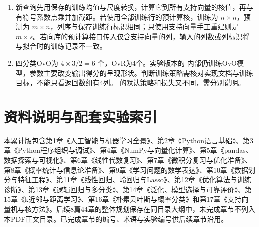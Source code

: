 \documentclass[UTF8,fontset=none,zihao=-4,a4paper]{ctexart}
\newcommand{\code}[1]{\texttt{\detokenize{#1}}}
\numberwithin{equation}{section}
\numberwithin{figure}{section}
\begin{document}
\begin{enumerate}[label=17.\arabic*]
\item 新查询先用保存的训练均值与尺度转换，计算它到所有支持向量的核值，再与有符号系数点乘并加截距。若使用全部训练行的预计算核，训练为 $n\times n$，预测为 $m\times n$，列序与保存训练行标识相同；只使用支持向量手工重建则是 $m\times s$。若向库的预计算接口传入仅含支持向量的列，输入的列数或列标识将与拟合时的训练记录不一致。
\item 四分类OvO为 $4\times3/2=6$ 个，OvR为4个。实验版本的 \code{SVC} 内部仍训练OvO模型，参数主要改变输出得分的呈现形状。判断训练策略需核对实现文档与训练目标，不能只看返回数组有4列。\code{LinearSVC} 的默认策略和损失又不同，需分别说明。
\end{enumerate}

\clearpage
\section*{资料说明与配套实验索引}
本累计版包含第1章《人工智能与机器学习全景》、第2章《Python语言基础》、第3章《Python程序组织与调试》、第4章《NumPy与向量化计算》、第5章《pandas、数据探索与可视化》、第6章《线性代数复习》、第7章《微积分复习与优化准备》、第8章《概率统计与信息论准备》、第9章《学习问题的数学表达》、第10章《数据划分与特征工程》、第11章《线性回归、岭回归与Lasso》、第12章《优化算法与训练诊断》、第13章《逻辑回归与多分类》、第14章《泛化、模型选择与可靠评价》、第15章《k近邻与距离学习》、第16章《朴素贝叶斯与概率分类》和第17章《支持向量机与核方法》。后续8篇44章的整体规划保存在同目录大纲中，未完成章节不列入本PDF正文目录。已完成章节的编号、术语与实验编号供后续章节沿用。
\end{document}
